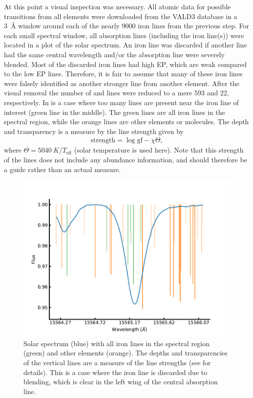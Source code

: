 At this point a visual inspection was necessary. All atomic data for possible transitions from all
elements were downloaded from the VALD3 database in a \SI{3}{\angstrom} window around each of the
nearly \num{9000} iron lines from the previous step. For each small spectral window, all absorption
lines (including the iron line(s)) were located in a plot of the solar spectrum. An iron line was
discarded if another line had the same central wavelength and/or the absorption line were severely
blended. Most of the discarded iron lines had high EP, which are weak compared to the low EP lines.
Therefore, it is fair to assume that many of these iron lines were falsely identified as another
stronger line from another element. After the visual removal the number of  and
 lines were reduced to a mere 593 and 22, respectively. In  is
a case where too many lines are present near the iron line of interest (green line in the middle).
The green lines are all iron lines in the spectral region, while the orange lines are other elements
or molecules. The depth and transparency is a measure by the line strength given by
\begin{align}
  \mathrm{strength} = \log\mathrm{gf} - \chi \Theta, \label{eq:strength}
\end{align}
where $\Theta=\SI{5040}{K}/T_\mathrm{eff}$ (solar temperature is used here). Note that this strength
of the lines does not include any abundance information, and should therefore be a guide rather than
an actual measure.

\begin{figure}[htpb!]
    \centering
    \includegraphics[width=0.8\linewidth]{figures/visualSelection.pdf}
    \caption{Solar spectrum (blue) with all iron lines in the spectral region (green) and other
             elements (orange). The depths and transparencies of the vertical lines are a measure of
             the line strengths (see  for details). This is a case where the iron
             line is discarded due to blending, which is clear in the left wing of the central
             absorption line.}
    \label{fig:visualSelection}
\end{figure}

